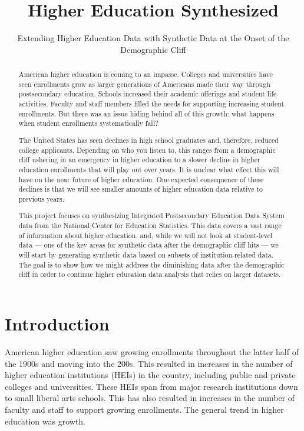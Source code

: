 \documentclass[sigconf, authorversion, nonacm]{acmart}
\begin{document}
\title{Higher Education Synthesized}
\subtitle{Extending Higher Education Data with Synthetic Data at the Onset of the Demographic Cliff}

\renewcommand{\shortauthors}{Leakakos}

\begin{abstract}
    American higher education is coming to an impasse. Colleges and universities have seen enrollments grow as larger generations of Americans made their way through postsecondary education. Schools increased their academic offerings and student life activities. Faculty and staff members filled the needs for supporting increasing student enrollments. But there was an issue hiding behind all of this growth: what happens when student enrollments systematically fall?

    The United States has seen declines in high school graduates and, therefore, reduced college applicants. Depending on who you listen to, this ranges from a demographic cliff ushering in an emergency in higher education to a slower decline in higher education enrollments that will play out over years. It is unclear what effect this will have on the near future of higher education. One expected consequence of these declines is that we will see smaller amounts of higher education data relative to previous years.

    This project focuses on synthesizing Integrated Postsecondary Education Data System data from the National Center for Education Statistics. This data covers a vast range of information about higher education, and, while we will not look at student-level data --- one of the key areas for synthetic data after the demographic cliff hits --- we will start by generating synthetic data based on subsets of institution-related data. The goal is to show how we might address the diminishing data after the demographic cliff in order to continue higher education data analysis that relies on larger datasets.
\end{abstract}

\maketitle

\section{Introduction}

    American higher education saw growing enrollments throughout the latter half of the 1900s and moving into the 200s. This resulted in increases in the number of higher education institutions (HEIs) in the country, including public and private colleges and universities. These HEIs span from major research institutions down to small liberal arts schools. This has also resulted in increases in the number of faculty and staff to support growing enrollments. The general trend in higher education was growth.
\end{document}
